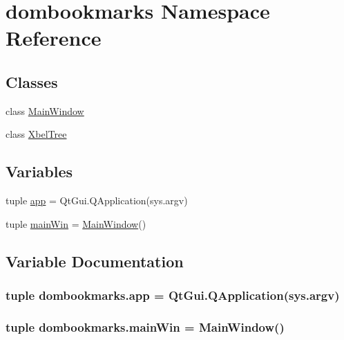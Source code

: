 \hypertarget{namespacedombookmarks}{}\section{dombookmarks Namespace Reference}
\label{namespacedombookmarks}
\subsection*{Classes}
\begin{DoxyCompactItemize}
\item 
class \hyperlink{classdombookmarks_1_1MainWindow}{Main\+Window}
\item 
class \hyperlink{classdombookmarks_1_1XbelTree}{Xbel\+Tree}
\end{DoxyCompactItemize}
\subsection*{Variables}
\begin{DoxyCompactItemize}
\item 
tuple \hyperlink{namespacedombookmarks_aed35a0dbc41dd2dcd906ef24333eff78}{app} = Qt\+Gui.\+Q\+Application(sys.\+argv)
\item 
tuple \hyperlink{namespacedombookmarks_a289688ed165413c0ccabb105cb23623d}{main\+Win} = \hyperlink{classdombookmarks_1_1MainWindow}{Main\+Window}()
\end{DoxyCompactItemize}


\subsection{Variable Documentation}
\hypertarget{namespacedombookmarks_aed35a0dbc41dd2dcd906ef24333eff78}{}
\subsubsection[{app}]{\setlength{\rightskip}{0pt plus 5cm}tuple dombookmarks.\+app = Qt\+Gui.\+Q\+Application(sys.\+argv)}\label{namespacedombookmarks_aed35a0dbc41dd2dcd906ef24333eff78}
\hypertarget{namespacedombookmarks_a289688ed165413c0ccabb105cb23623d}{}
\subsubsection[{main\+Win}]{\setlength{\rightskip}{0pt plus 5cm}tuple dombookmarks.\+main\+Win = {\bf Main\+Window}()}\label{namespacedombookmarks_a289688ed165413c0ccabb105cb23623d}
